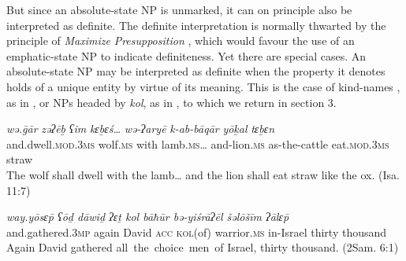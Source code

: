 \documentclass[output=paper]{langsci/langscibook}
\begin{document}
But since an absolute-state NP is unmarked, it can on principle also be interpreted as definite. The definite interpretation is normally thwarted by the principle of \textit{Maximize} \textit{Presupposition} \citep{Heim1991}, which would favour the use of an emphatic-state NP to indicate definiteness. Yet there are special cases. An absolute-state NP may be interpreted as definite when the property it denotes holds of a unique entity by virtue of its meaning. This is the case of kind-names \citep{Doron2003}, as in , or NPs headed by \textit{kol}, as in , to which we return in section 3.

\ea%
    \label{ex:doron:5}
    \gll \textit{wə.ḡār}                        \textit{zəʔēḇ}      \textit{ʕim}  \textit{kɛḇɛś…}       \textit{wə-ʔaryē}        \textit{k-ab-bāqār}   \textit{yōḵal}              \textit{tɛḇɛn}\\
         and.dwell.\textsc{mod.3ms}   wolf.\textsc{ms}  with lamb.\textsc{ms}… and-lion\textsc{.ms}   as-the-cattle  eat.\textsc{mod.3ms}  straw\\
    \glt The wolf shall dwell with the lamb… and the lion shall eat straw like the ox. (Isa. 11:7)
    \z


\ea%
    \label{ex:doron:6}
    \gll \textit{way.yōsɛ\={p}              ʕōḏ    dāwiḏ  ʔɛṯ   kol        bāħūr          bə-yiśrāʔēl   šəlōšīm ʔālɛ\={p}}\\
         and.gathered.\textsc{3mp}  again David  \textsc{acc} \textsc{kol}(of) warrior.\textsc{ms} in-Israel      thirty    thousand\\
    \glt Again David gathered all~the~choice~men~of Israel, thirty thousand. (2Sam. 6:1)
    \z
\end{document}
